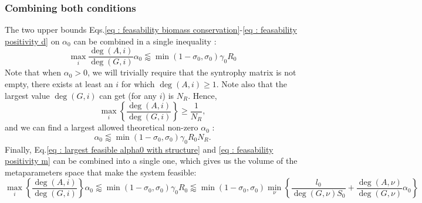 \documentclass[12pt, titlepage]{report}
\begin{document}
\subsubsection{Combining both conditions}
The two upper bounds Eqs.\eqref{eq : feasability biomass conservation}-\eqref{eq : feasability positivity d} on $\alpha_0$ can be combined in a single inequality :
\begin{equation} \label{eq : largest feasible alpha0 with structure}
\max_i{\frac{\deg(A,i)}{\deg(G,i)}} \alpha_0 \lessapprox \min(1-\sigma_0, \sigma_0) \gamma_0 R_0
\end{equation}
Note that when $\alpha_0 > 0$, we will trivially require that the syntrophy matrix is not empty, \ie there exists at least an $i$ for which $\deg(A,i) \geq 1$. Note also that the largest value $\deg(G,i)$ can get (for any $i$) is $N_R$. Hence,
\begin{equation}
\max_i\left\{ \frac{\deg(A,i)}{\deg(G,i)} \right\} \geq \frac{1}{N_R},
\end{equation}
and we can find a largest allowed theoretical non-zero $\alpha_0$ :
\begin{equation}
\alpha_0 \lessapprox \min(1-\sigma_0, \sigma_0) \gamma_0 R_0 N_R. \label{eq : largest feasible alpha0}
\end{equation}
Finally, Eq.\eqref{eq : largest feasible alpha0 with structure} and \eqref{eq : feasability positivity m} can be combined into a single one, which gives us the volume of the metaparameters space that make the system feasible:
\begin{equation}
\boxed{
\max_i\left\{\frac{\deg(A,i)}{\deg(G,i)}\right\} \alpha_0
\lessapprox \min(1-\sigma_0, \sigma_0) \gamma_0 R_0
\lessapprox
\min \left(1-\sigma_0, \sigma_0 \right) \min_\nu \left\{ \frac{l_0}{\deg(G,\nu) S_0} + \frac{\deg(A,\nu)}{\deg(G,\nu)}\alpha_0\right\}
}\label{eq : fully feasible volume}
\end{equation}
\end{document}
